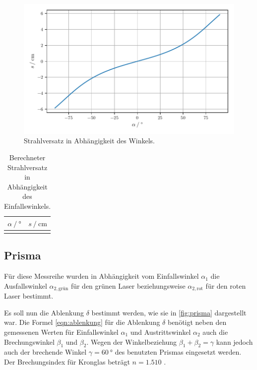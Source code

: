 \begin{figure}
    \centering
    \includegraphics[width=\textwidth]{build/plt/strahlversatz.pdf}
    \caption{Strahlversatz in Abhängigkeit des Winkels.}
    \label{fig:plt_strahlversatz}
\end{figure}

\begin{table}
  \centering
  \caption{Berechneter Strahlversatz in Abhängigkeit des Einfallswinkels.}
  \label{tab:strahlversatz}
  \begin{tabular}{S S}
    \toprule
    {$\alpha \mathbin{/} \si{\degree}$} &
    {$s \mathbin{/} \si{\centi\meter}$} \\
    \midrule
    \bottomrule
  \end{tabular}
\end{table}


\FloatBarrier %
\subsection{Prisma}
\label{sec:auswertung:prisma}
Für diese Messreihe wurden in Abhängigkeit vom Einfallswinkel $\alpha_1$
die Ausfallswinkel
$\alpha_{2, \text{grün}}$ für den grünen Laser
beziehungsweise
$\alpha_{2, \text{rot}}$ für den roten Laser
bestimmt.

Es soll nun die Ablenkung $\delta$ bestimmt werden,
wie sie in \autoref{fig:prisma} dargestellt war.
%
%
Die Formel \eqref{eqn:ablenkung} für die Ablenkung $\delta$
benötigt neben den gemessenen Werten
für Einfallswinkel $\alpha_1$ und Austrittswinkel $\alpha_2$
auch die Brechungswinkel $\beta_1$ und $\beta_2$.
Wegen der Winkelbeziehung $\beta_1 + \beta_2 = \gamma$
kann jedoch auch der brechende Winkel
$\gamma = \SI{60}{\degree}$ \cite{versuchsanleitung}
des benutzten Prismas eingesetzt werden.
Der Brechungsindex für Kronglas beträgt $n = \num{1.510}$ \cite{n_kronglas}.


